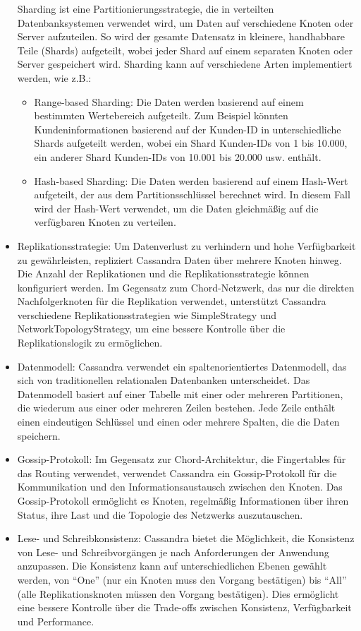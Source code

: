 \begin{itemize}
Sharding ist eine Partitionierungsstrategie, die in verteilten Datenbanksystemen verwendet wird, um Daten auf verschiedene Knoten oder Server aufzuteilen. So wird der gesamte Datensatz in kleinere, handhabbare Teile (Shards) aufgeteilt, wobei jeder Shard auf einem separaten Knoten oder Server gespeichert wird. Sharding kann auf verschiedene Arten implementiert werden, wie z.B.:
\begin{itemize} 
\item Range-based Sharding: Die Daten werden basierend auf einem bestimmten Wertebereich aufgeteilt. Zum Beispiel könnten Kundeninformationen basierend auf der Kunden-ID in unterschiedliche Shards aufgeteilt werden, wobei ein Shard Kunden-IDs von 1 bis 10.000, ein anderer Shard Kunden-IDs von 10.001 bis 20.000 usw. enthält.
\item Hash-based Sharding: Die Daten werden basierend auf einem Hash-Wert aufgeteilt, der aus dem Partitionsschlüssel berechnet wird. In diesem Fall wird der Hash-Wert verwendet, um die Daten gleichmäßig auf die verfügbaren Knoten zu verteilen.
\end{itemize}  
\item Replikationsstrategie: Um Datenverlust zu verhindern und hohe Verfügbarkeit zu gewährleisten, repliziert Cassandra Daten über mehrere Knoten hinweg. Die Anzahl der Replikationen und die Replikationsstrategie können konfiguriert werden. Im Gegensatz zum Chord-Netzwerk, das nur die direkten Nachfolgerknoten für die Replikation verwendet, unterstützt Cassandra verschiedene Replikationsstrategien wie SimpleStrategy und NetworkTopologyStrategy, um eine bessere Kontrolle über die Replikationslogik zu ermöglichen.
\item Datenmodell: Cassandra verwendet ein spaltenorientiertes Datenmodell, das sich von traditionellen relationalen Datenbanken unterscheidet. Das Datenmodell basiert auf einer Tabelle mit einer oder mehreren Partitionen, die wiederum aus einer oder mehreren Zeilen bestehen. Jede Zeile enthält einen eindeutigen Schlüssel und einen oder mehrere Spalten, die die Daten speichern.
\item Gossip-Protokoll: Im Gegensatz zur Chord-Architektur, die Fingertables für das Routing verwendet, verwendet Cassandra ein Gossip-Protokoll für die Kommunikation und den Informationsaustausch zwischen den Knoten. Das Gossip-Protokoll ermöglicht es Knoten, regelmäßig Informationen über ihren Status, ihre Last und die Topologie des Netzwerks auszutauschen.
\item Lese- und Schreibkonsistenz: Cassandra bietet die Möglichkeit, die Konsistenz von Lese- und Schreibvorgängen je nach Anforderungen der Anwendung anzupassen. Die Konsistenz kann auf unterschiedlichen Ebenen gewählt werden, von \enquote{One} (nur ein Knoten muss den Vorgang bestätigen) bis \enquote{All} (alle Replikationsknoten müssen den Vorgang bestätigen). Dies ermöglicht eine bessere Kontrolle über die Trade-offs zwischen Konsistenz, Verfügbarkeit und Performance.

\end{itemize}
